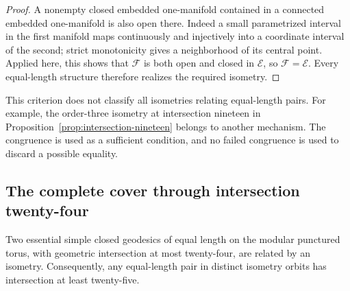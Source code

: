 \begin{proof}
A nonempty closed embedded one-manifold contained in a connected embedded one-manifold is also open there. Indeed a small parametrized interval in the first manifold maps continuously and injectively into a coordinate interval of the second; strict monotonicity gives a neighborhood of its central point. Applied here, this shows that $\mathcal F$ is both open and closed in $\mathcal E$, so $\mathcal F=\mathcal E$. Every equal-length structure therefore realizes the required isometry.
\end{proof}

This criterion does not classify all isometries relating equal-length pairs. For example, the order-three isometry at intersection nineteen in Proposition~\ref{prop:intersection-nineteen} belongs to another mechanism. The congruence is used as a sufficient condition, and no failed congruence is used to discard a possible equality.

\subsection{The complete cover through intersection twenty-four}

\begin{theorem}
\label{thm:small-intersections}
Two essential simple closed geodesics of equal length on the modular punctured torus, with geometric intersection at most twenty-four, are related by an isometry. Consequently, any equal-length pair in distinct isometry orbits has intersection at least twenty-five.
\end{theorem}

